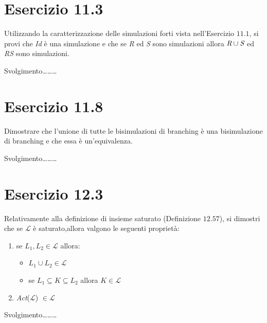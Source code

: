 		\newpage
		
	\section{Esercizio 11.3}
		\qquad Utilizzando la caratterizzazione delle simulazioni forti vista
		nell'Esercizio $11.1$, si provi che \emph{Id} \`e una simulazione e che se
		\emph{R} ed \emph{S} sono simulazioni allora $\emph{R} \cup \emph{S}$ ed
		\emph{RS} sono simulazioni.
		
		\sectionline
		
		\qquad Svolgimento\ldots\ldots\ldots
		
		\newpage
		
	\section{Esercizio 11.8}
		\qquad Dimostrare che l'unione di tutte le bisimulazioni di branching \`e una
		bisimulazione di branching e che essa \`e un'equivalenza.
		
		\sectionline
		
		\qquad Svolgimento\ldots\ldots\ldots
		
		\newpage
		
	\section{Esercizio 12.3}
		\quad Relativamente alla definizione di insieme saturato (Definizione $12.57$), si dimostri che se $\mathcal{L}$ \`e saturato,allora valgono le
		seguenti propriet\`a:
		\begin{enumerate}
		  \item se $L_1,L_2 \in \mathcal{L}$ allora:
		  \begin{itemize}
		    \item $L_1 \cup L_2 \in \mathcal{L}$
		    \item se $L_1 \subseteq K \subseteq L_2$ allora $K \in \mathcal{L}$
		  \end{itemize}
		  \item \emph{Act}($\mathcal{L}$) $\in \mathcal{L}$
		\end{enumerate}
		
		\sectionline
		
		\qquad Svolgimento\ldots\ldots\ldots